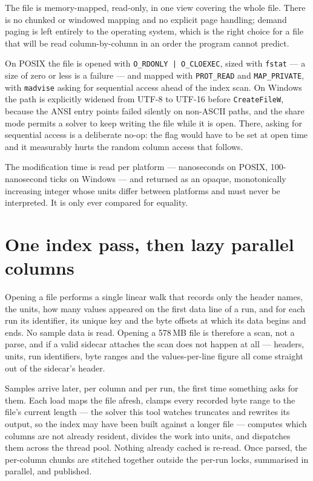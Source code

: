 \documentclass[11pt,a4paper,oneside]{report}
\newcommand{\code}[1]{\texttt{#1}}
\begin{document}
The file is memory-mapped, read-only, in one view covering the whole file. There
is no chunked or windowed mapping and no explicit page handling; demand paging is
left entirely to the operating system, which is the right choice for a file that
will be read column-by-column in an order the program cannot predict.

On POSIX the file is opened with \code{O\_RDONLY | O\_CLOEXEC}, sized with
\code{fstat} --- a size of zero or less is a failure --- and mapped with
\code{PROT\_READ} and \code{MAP\_PRIVATE}, with \code{madvise} asking for
sequential access ahead of the index scan. On Windows the path is explicitly
widened from UTF-8 to UTF-16 before \code{CreateFileW}, because the ANSI entry
points failed silently on non-ASCII paths, and the share mode permits a solver to
keep writing the file while it is open. There, asking for sequential access is a
deliberate no-op: the flag would have to be set at open time and it measurably
hurts the random column access that follows.

The modification time is read per platform --- nanoseconds on POSIX,
100-nanosecond ticks on Windows --- and returned as an opaque, monotonically
increasing integer whose units differ between platforms and must never be
interpreted. It is only ever compared for equality.

\section{One index pass, then lazy parallel columns}

Opening a file performs a single linear walk that records only the header names,
the units, how many values appeared on the first data line of a run, and for each
run its identifier, its unique key and the byte offsets at which its data begins
and ends. No sample data is read. Opening a 578\,MB file is therefore a scan, not
a parse, and if a valid sidecar attaches the scan does not happen at all ---
headers, units, run identifiers, byte ranges and the values-per-line figure all
come straight out of the sidecar's header.

Samples arrive later, per column and per run, the first time something asks for
them. Each load maps the file afresh, clamps every recorded byte range to the
file's current length --- the solver this tool watches truncates and rewrites its
output, so the index may have been built against a longer file --- computes which
columns are not already resident, divides the work into units, and dispatches
them across the thread pool. Nothing already cached is re-read. Once parsed, the
per-column chunks are stitched together outside the per-run locks, summarised in
parallel, and published.
\end{document}
